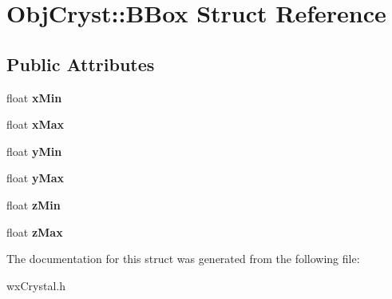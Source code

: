 \hypertarget{struct_obj_cryst_1_1_b_box}{}\section{Obj\+Cryst\+::B\+Box Struct Reference}
\label{struct_obj_cryst_1_1_b_box}
\subsection*{Public Attributes}
\begin{DoxyCompactItemize}
\item 
\mbox{\label{struct_obj_cryst_1_1_b_box_a18f9d399274a69731825439e2701bdc5}} 
float {\bfseries x\+Min}
\item 
\mbox{\label{struct_obj_cryst_1_1_b_box_a55b7786434f3cf17eb24f8539921d4d0}} 
float {\bfseries x\+Max}
\item 
\mbox{\label{struct_obj_cryst_1_1_b_box_a5f4160f04e0d766623ceb91d8c53aeff}} 
float {\bfseries y\+Min}
\item 
\mbox{\label{struct_obj_cryst_1_1_b_box_a27575d0f5596c0d2a9cffc31dc85145e}} 
float {\bfseries y\+Max}
\item 
\mbox{\label{struct_obj_cryst_1_1_b_box_ae57d660e918bc17fb3db46f51669fe1f}} 
float {\bfseries z\+Min}
\item 
\mbox{\label{struct_obj_cryst_1_1_b_box_a19f876bd0990d6c4551602eb3699eb0c}} 
float {\bfseries z\+Max}
\end{DoxyCompactItemize}


The documentation for this struct was generated from the following file\+:\begin{DoxyCompactItemize}
\item 
wx\+Crystal.\+h\end{DoxyCompactItemize}
